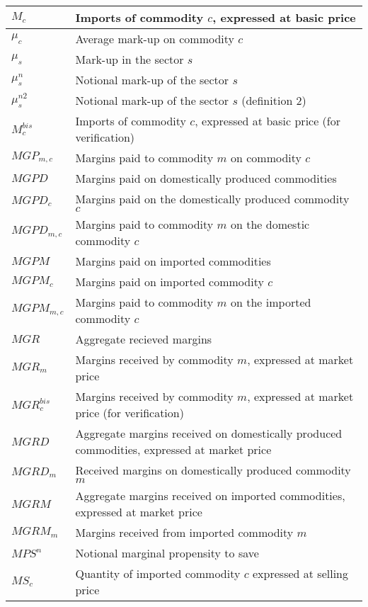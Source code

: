 \documentclass[12pt]{article}
\numberwithin{equation}{section}
\begin{document}
\begin{longtable}{@{}p{4cm}p{9cm}@{}}
 \midrule 
$M_{c}$ & Imports of commodity $c$, expressed at basic price \\
 \midrule 
$\mu_{c}$ & Average mark-up on commodity $c$ \\
 \midrule 
$\mu_{s}$ & Mark-up in the sector $s$ \\
 \midrule 
$\mu^{n}_{s}$ & Notional mark-up of the sector $s$ \\
 \midrule 
$\mu^{n2}_{s}$ & Notional mark-up of the sector $s$ (definition 2) \\
 \midrule 
$M^{bis}_{c}$ & Imports of commodity $c$, expressed at basic price (for verification) \\
 \midrule 
$MGP_{m, c}$ & Margins paid to commodity $m$ on commodity $c$ \\
 \midrule 
$MGPD$ & Margins paid on domestically produced commodities \\
 \midrule 
$MGPD_{c}$ & Margins paid on the domestically produced commodity $c$ \\
 \midrule 
$MGPD_{m, c}$ & Margins paid to commodity $m$ on the domestic commodity $c$ \\
 \midrule 
$MGPM$ & Margins paid on imported commodities \\
 \midrule 
$MGPM_{c}$ & Margins paid on imported commodity $c$ \\
 \midrule 
$MGPM_{m, c}$ & Margins paid to commodity $m$ on the imported commodity $c$ \\
 \midrule 
$MGR$ & Aggregate recieved margins \\
 \midrule 
$MGR_{m}$ & Margins received by commodity $m$, expressed at market price \\
 \midrule 
$MGR^{bis}_{c}$ & Margins received by commodity $m$, expressed at market price (for verification) \\
 \midrule 
$MGRD$ & Aggregate margins received on domestically produced commodities, expressed at market price \\
 \midrule 
$MGRD_{m}$ & Received margins on domestically produced commodity $m$ \\
 \midrule 
$MGRM$ & Aggregate margins received on imported commodities, expressed at market price \\
 \midrule 
$MGRM_{m}$ & Margins received from imported commodity $m$ \\
 \midrule 
$MPS^{n}$ & Notional marginal propensity to save \\
 \midrule 
$MS_{c}$ & Quantity of imported commodity $c$ expressed at selling price \\

\end{longtable}
\end{document}
